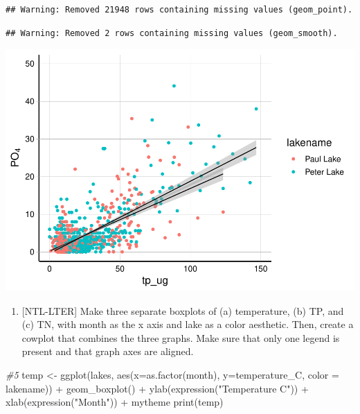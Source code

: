 \documentclass[
]{article}
\newenvironment{Shaded}{\begin{snugshade}}{\end{snugshade}}
\newcommand{\AttributeTok}[1]{\textcolor[rgb]{0.77,0.63,0.00}{#1}}
\newcommand{\CommentTok}[1]{\textcolor[rgb]{0.56,0.35,0.01}{\textit{#1}}}
\newcommand{\FunctionTok}[1]{\textcolor[rgb]{0.00,0.00,0.00}{#1}}
\newcommand{\NormalTok}[1]{#1}
\newcommand{\OtherTok}[1]{\textcolor[rgb]{0.56,0.35,0.01}{#1}}
\newcommand{\SpecialCharTok}[1]{\textcolor[rgb]{0.00,0.00,0.00}{#1}}
\newcommand{\StringTok}[1]{\textcolor[rgb]{0.31,0.60,0.02}{#1}}
\providecommand{\tightlist}{%
  \setlength{\itemsep}{0pt}\setlength{\parskip}{0pt}}
\begin{document}
\begin{verbatim}
## Warning: Removed 21948 rows containing missing values (geom_point).
\end{verbatim}

\begin{verbatim}
## Warning: Removed 2 rows containing missing values (geom_smooth).
\end{verbatim}

\includegraphics{A05_DataVisualization_files/figure-latex/unnamed-chunk-3-1.pdf}

\begin{enumerate}
\def\labelenumi{\arabic{enumi}.}
\setcounter{enumi}{4}
\tightlist
\item
  {[}NTL-LTER{]} Make three separate boxplots of (a) temperature, (b)
  TP, and (c) TN, with month as the x axis and lake as a color
  aesthetic. Then, create a cowplot that combines the three graphs. Make
  sure that only one legend is present and that graph axes are aligned.
\end{enumerate}

\begin{Shaded}
\begin{Highlighting}[]
\CommentTok{\#5}
\NormalTok{temp }\OtherTok{\textless{}{-}} \FunctionTok{ggplot}\NormalTok{(lakes, }\FunctionTok{aes}\NormalTok{(}\AttributeTok{x=}\FunctionTok{as.factor}\NormalTok{(month), }\AttributeTok{y=}\NormalTok{temperature\_C, }\AttributeTok{color =}\NormalTok{ lakename)) }\SpecialCharTok{+} 
  \FunctionTok{geom\_boxplot}\NormalTok{() }\SpecialCharTok{+} 
  \FunctionTok{ylab}\NormalTok{(}\FunctionTok{expression}\NormalTok{(}\StringTok{"Temperature C"}\NormalTok{)) }\SpecialCharTok{+}
  \FunctionTok{xlab}\NormalTok{(}\FunctionTok{expression}\NormalTok{(}\StringTok{"Month"}\NormalTok{)) }\SpecialCharTok{+} 
\NormalTok{  mytheme}
\FunctionTok{print}\NormalTok{(temp)}
\end{Highlighting}
\end{Shaded}
\end{document}
